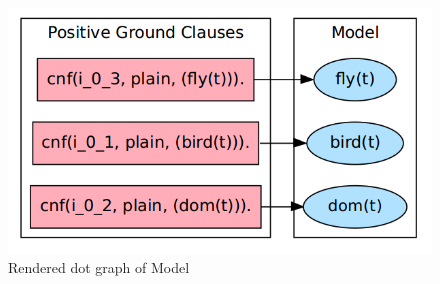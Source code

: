 						
			\begin{figure}[H]
				\centering
				\includegraphics[scale=0.42]{pictures/dot_graph.png}
				\caption{Rendered dot graph of Model\label{fig:dot_graph}}
			\end{figure}
		
